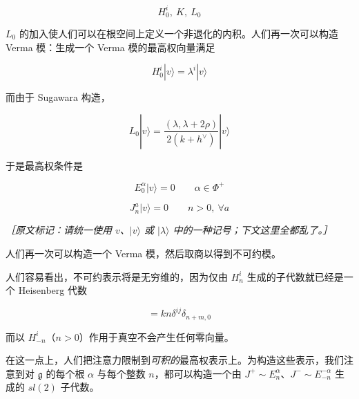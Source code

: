 \begin{equation}
  H^i_0,\ K,\ L_0
  \tag{4.125}
  \label{eq:4.125}
\end{equation}

$L_0$ 的加入使人们可以在根空间上定义一个非退化的内积。人们再一次可以构造 Verma 模：生成一个 Verma 模的最高权向量满足

\begin{equation}
  H^i_0|v\rangle=\lambda^i|v\rangle
  \tag{4.126}
  \label{eq:4.126}
\end{equation}

而由于 Sugawara 构造，

\begin{equation}
  L_0|v\rangle=\frac{(\lambda,\lambda+2\rho)}{2(k+h^\vee)}|v\rangle
  \tag{4.127}
  \label{eq:4.127}
\end{equation}

于是最高权条件是

\begin{equation}
  E^\alpha_0|v\rangle=0\qquad \alpha\in\Phi^+
  \tag{4.128}
  \label{eq:4.128}
\end{equation}

\begin{equation}
  J^a_n|v\rangle=0\qquad n>0,\ \forall a
  \tag{4.129}
  \label{eq:4.129}
\end{equation}

{\small\itshape ［原文标记：请统一使用 $v$、$|v\rangle$ 或 $|\lambda\rangle$ 中的一种记号；下文这里全都乱了。］}

人们再一次可以构造一个 Verma 模，然后取商以得到不可约模。

人们容易看出，不可约表示将是无穷维的，因为仅由 $H^i_n$ 生成的子代数就已经是一个 Heisenberg 代数

\begin{equation}
  [H^i_n,H^j_m]=kn\delta^{ij}\delta_{n+m,0}
  \tag{4.130}
  \label{eq:4.130}
\end{equation}

而以 $H^i_{-n}$（$n>0$）作用于真空不会产生任何零向量。


在这一点上，人们把注意力限制到\emph{可积的}最高权表示上。为构造这些表示，我们注意到对 $\mathfrak{g}$ 的每个根 $\alpha$ 与每个整数 $n$，都可以构造一个由 $J^+\sim E^\alpha_n$、$J^-\sim E^{-\alpha}_{-n}$ 生成的 $sl(2)$ 子代数。


